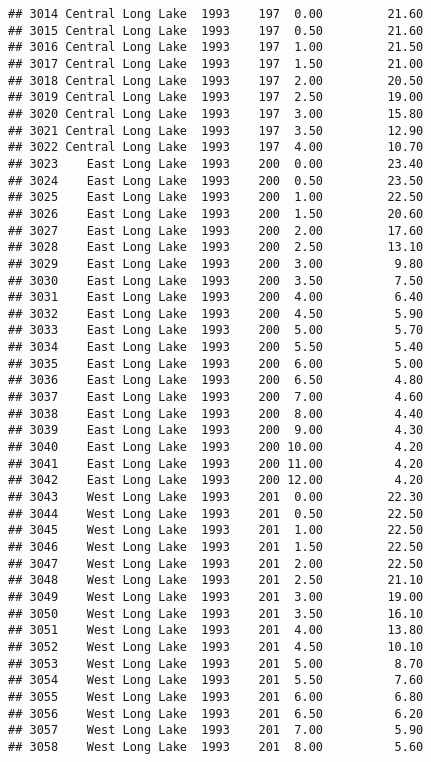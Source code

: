 \documentclass[
]{article}
\begin{document}
\begin{verbatim}
## 3014 Central Long Lake  1993    197  0.00         21.60
## 3015 Central Long Lake  1993    197  0.50         21.60
## 3016 Central Long Lake  1993    197  1.00         21.50
## 3017 Central Long Lake  1993    197  1.50         21.00
## 3018 Central Long Lake  1993    197  2.00         20.50
## 3019 Central Long Lake  1993    197  2.50         19.00
## 3020 Central Long Lake  1993    197  3.00         15.80
## 3021 Central Long Lake  1993    197  3.50         12.90
## 3022 Central Long Lake  1993    197  4.00         10.70
## 3023    East Long Lake  1993    200  0.00         23.40
## 3024    East Long Lake  1993    200  0.50         23.50
## 3025    East Long Lake  1993    200  1.00         22.50
## 3026    East Long Lake  1993    200  1.50         20.60
## 3027    East Long Lake  1993    200  2.00         17.60
## 3028    East Long Lake  1993    200  2.50         13.10
## 3029    East Long Lake  1993    200  3.00          9.80
## 3030    East Long Lake  1993    200  3.50          7.50
## 3031    East Long Lake  1993    200  4.00          6.40
## 3032    East Long Lake  1993    200  4.50          5.90
## 3033    East Long Lake  1993    200  5.00          5.70
## 3034    East Long Lake  1993    200  5.50          5.40
## 3035    East Long Lake  1993    200  6.00          5.00
## 3036    East Long Lake  1993    200  6.50          4.80
## 3037    East Long Lake  1993    200  7.00          4.60
## 3038    East Long Lake  1993    200  8.00          4.40
## 3039    East Long Lake  1993    200  9.00          4.30
## 3040    East Long Lake  1993    200 10.00          4.20
## 3041    East Long Lake  1993    200 11.00          4.20
## 3042    East Long Lake  1993    200 12.00          4.20
## 3043    West Long Lake  1993    201  0.00         22.30
## 3044    West Long Lake  1993    201  0.50         22.50
## 3045    West Long Lake  1993    201  1.00         22.50
## 3046    West Long Lake  1993    201  1.50         22.50
## 3047    West Long Lake  1993    201  2.00         22.50
## 3048    West Long Lake  1993    201  2.50         21.10
## 3049    West Long Lake  1993    201  3.00         19.00
## 3050    West Long Lake  1993    201  3.50         16.10
## 3051    West Long Lake  1993    201  4.00         13.80
## 3052    West Long Lake  1993    201  4.50         10.10
## 3053    West Long Lake  1993    201  5.00          8.70
## 3054    West Long Lake  1993    201  5.50          7.60
## 3055    West Long Lake  1993    201  6.00          6.80
## 3056    West Long Lake  1993    201  6.50          6.20
## 3057    West Long Lake  1993    201  7.00          5.90
## 3058    West Long Lake  1993    201  8.00          5.60

\end{verbatim}
\end{document}
